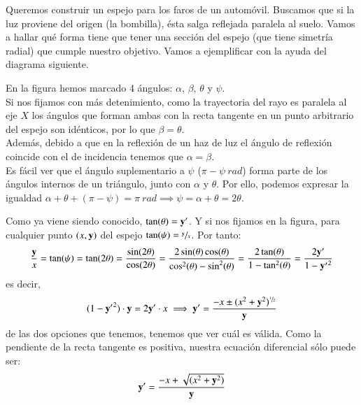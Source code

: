 \begin{eg}
    Queremos construir un espejo para los faros de un automóvil. Buscamos que si la luz proviene del origen (la bombilla), ésta salga reflejada paralela al suelo. Vamos a hallar qué forma tiene que tener una sección del espejo (que tiene simetría radial) que cumple nuestro objetivo. Vamos a ejemplificar con la ayuda del diagrama siguiente.\\
    \begin{minipage}[c]{0.5\linewidth}
      \begin{center}
      \end{center}
    \end{minipage}\hfill
    \begin{minipage}[c]{0.45\textwidth}
        En la figura hemos marcado 4 ángulos: $\alpha$, $\beta$, $\theta$ y $\psi$.\\ Si nos fijamos con más detenimiento, como la trayectoria del rayo es paralela al eje $X$ los ángulos que forman ambas con la recta tangente en un punto arbitrario del espejo son idénticos, por lo que $\beta = \theta$.\\ Además, debido a que en la reflexión de un haz de luz el ángulo de reflexión coincide con el de incidencia tenemos que $\alpha = \beta$.\\ Es fácil ver que el ángulo suplementario a $\psi$ ($\pi - \psi\ rad$) forma parte de los ángulos internos de un triángulo, junto con $\alpha$ y $\theta$. Por ello, podemos expresar la igualdad $\alpha + \theta + (\pi - \psi) = \pi\ rad \implies \psi = \alpha + \theta = 2\theta$.
    \end{minipage}
    Como ya viene siendo conocido, $\tan(\theta) = \mathbf{y}'$. Y si nos fijamos en la figura, para cualquier punto $(x,\mathbf{y})$ del espejo $\tan(\psi) = \sfrac{\mathbf{y}}{x}$. Por tanto:
    $$
        \frac{\mathbf{y}}{x} = \tan(\psi) = \tan(2\theta) = \frac{\sin(2\theta)}{\cos(2\theta)} = \frac{2\sin(\theta)\cos(\theta)}{\cos^2(\theta)-\sin^2(\theta)} = \frac{2\tan(\theta)}{1-\tan^2(\theta)} = \frac{2\mathbf{y'}}{1-\mathbf{y'}^2}
    $$
    es decir,
    $$
        (1-\mathbf{y'}^2)\cdot \mathbf{y} = 2\mathbf{y'}\cdot x \implies \mathbf{y'} = \frac{-x \pm (x^2+\mathbf{y}^2)^{\sfrac{1}{2}}}{\mathbf{y}}
    $$
    de las dos opciones que tenemos, tenemos que ver cuál es válida. Como la pendiente de la recta tangente es positiva, nuestra ecuación diferencial sólo puede ser:
    $$
        \mathbf{y'} = \frac{-x + \sqrt{(x^2+\mathbf{y}^2)}}{\mathbf{y}}
$$
\end{eg}
